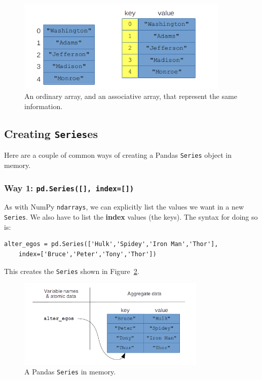\begin{figure}[ht]
\centering
\includegraphics[width=0.9\textwidth]{assocArraysAreArrays.png}
\caption{An ordinary array, and an associative array, that represent the same
information.}
\label{fig:assocArraysAreArrays}
\end{figure}


\subsection{Creating \texttt{Series}es}

Here are a couple of common ways of creating a Pandas \texttt{Series} object in
memory.

\subsubsection{Way 1: \texttt{pd.Series([], index=[])}}

As with NumPy \texttt{ndarrays}, we can explicitly list the values we want in a
new \texttt{Series}. We also have to list the \textbf{index} values (the keys).
The syntax for doing so is:

\begin{Verbatim}[fontsize=\small,samepage=true,frame=single,framesep=3mm]
alter_egos = pd.Series(['Hulk','Spidey','Iron Man','Thor'],
    index=['Bruce','Peter','Tony','Thor'])
\end{Verbatim}

This creates the \texttt{Series} shown in Figure~\ref{fig:Series}.

\begin{figure}[ht]
\centering
\includegraphics[width=0.8\textwidth]{Series.png}
\caption{A Pandas \texttt{Series} in memory.}
\label{fig:Series}
\end{figure}

